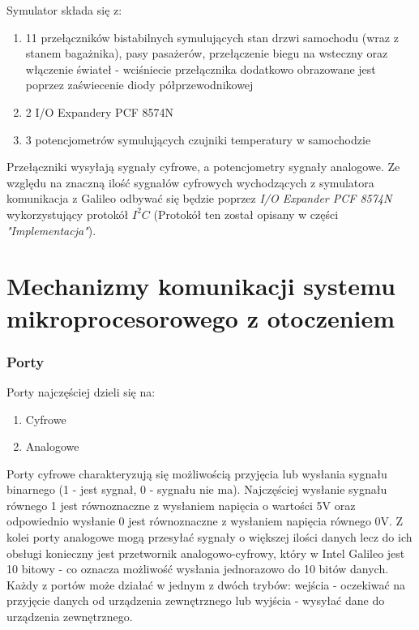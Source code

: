 \documentclass{xmgr}
\begin{document}
Symulator składa się z:
\begin{enumerate}
	\item 11 przełączników bistabilnych symulujących stan drzwi samochodu (wraz z stanem bagażnika), pasy pasażerów, przełączenie biegu na wsteczny oraz włączenie świateł - wciśniecie przełącznika dodatkowo obrazowane jest poprzez zaświecenie diody półprzewodnikowej
	\item 2 I/O Expandery PCF 8574N 
	\item 3 potencjometrów symulujących czujniki temperatury w samochodzie
\end{enumerate}

Przełączniki wysyłają sygnały cyfrowe, a potencjometry sygnały analogowe. Ze względu na znaczną ilość sygnałów cyfrowych wychodzących z symulatora komunikacja z Galileo odbywać się będzie poprzez \emph{I/O Expander PCF 8574N} wykorzystujący protokół  $I^2C$ (Protokół ten został opisany w części \emph{"Implementacja"}).

\chapter{Mechanizmy komunikacji systemu mikroprocesorowego z otoczeniem}
\subsection{Porty}
Porty najczęściej dzieli się na:
\begin{enumerate}
	\item Cyfrowe
	\item Analogowe
\end{enumerate}

Porty cyfrowe charakteryzują się możliwością przyjęcia lub wysłania sygnału binarnego (1 - jest sygnał, 0 - sygnału nie ma). Najczęściej wysłanie sygnału równego 1 jest równoznaczne z wysłaniem napięcia o wartości 5V oraz odpowiednio wysłanie 0 jest równoznaczne z wysłaniem napięcia równego 0V. Z kolei porty analogowe mogą przesyłać sygnały o większej ilości danych lecz do ich obsługi konieczny jest przetwornik analogowo-cyfrowy, który w Intel Galileo jest 10 bitowy - co oznacza możliwość wysłania jednorazowo do 10 bitów danych. Każdy z portów może działać w jednym  z dwóch trybów: wejścia - oczekiwać na przyjęcie danych od urządzenia zewnętrznego lub wyjścia - wysyłać dane do urządzenia zewnętrznego.
\end{document}
